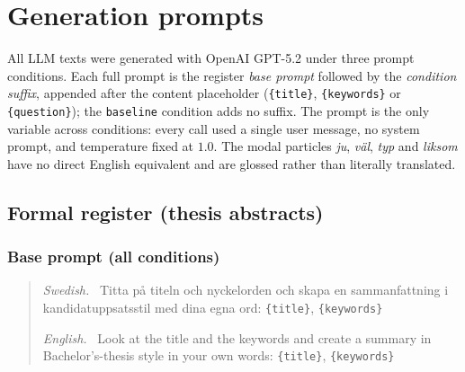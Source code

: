 %
%     
%

\chapter{Generation prompts}
\label{app:prompts}

All LLM texts were generated with OpenAI GPT-5.2 under three prompt
conditions. Each full prompt is the register \emph{base prompt} followed
by the \emph{condition suffix}, appended after the content placeholder
(\texttt{\{title\}}, \texttt{\{keywords\}} or \texttt{\{question\}}); the
\texttt{baseline} condition adds no suffix. The prompt is the only
variable across conditions: every call used a single user message, no
system prompt, and temperature fixed at $1.0$. The modal particles
\emph{ju}, \emph{väl}, \emph{typ} and \emph{liksom} have no direct
English equivalent and are glossed rather than literally translated.

\section{Formal register (thesis abstracts)}

\subsection*{Base prompt (all conditions)}
\begin{quote}
\textit{Swedish.}~ Titta på titeln och nyckelorden och skapa en
sammanfattning i kandidatuppsatsstil med dina egna ord:
\texttt{\{title\}}, \texttt{\{keywords\}}
\par\smallskip
\textit{English.}~ Look at the title and the keywords and create a
summary in Bachelor's-thesis style in your own words:
\texttt{\{title\}}, \texttt{\{keywords\}}
\end{quote}

